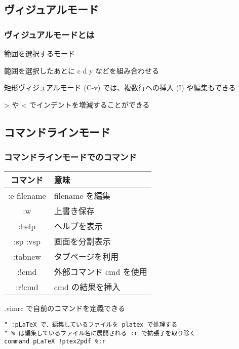 \documentclass[unicode,aspectratio=1610,colorlinks,handout]{beamer}
\begin{document}
\begin{frame}
	\section{ヴィジュアルモード}
\end{frame}

\begin{frame}
	\frametitle{ヴィジュアルモードとは}
	範囲を選択するモード
	
	範囲を選択したあとに c d y などを組み合わせる
	
	矩形ヴィジュアルモード (C-v) では、複数行への挿入 (I) や編集もできる
	
	> や < でインデントを増減することができる
\end{frame}

\begin{frame}
	\section{コマンドラインモード}
\end{frame}

\begin{frame}[fragile]
	\frametitle{コマンドラインモードでのコマンド}
	\begin{center}
		\begin{tabular}{cl}
			コマンド&意味\\
			\hline
			:e filename&filename を編集\\
			:w&上書き保存\\
			:help&ヘルプを表示\\
			:sp :vsp&画面を分割表示\\
			:tabnew&タブページを利用\\
			:!cmd&外部コマンド cmd を使用\\
			:r!cmd&cmd の結果を挿入
		\end{tabular}
	\end{center}
	
	.vimrc で自前のコマンドを定義できる
	
	\begin{lstlisting}
" :pLaTeX で、編集しているファイルを platex で処理する
" % は編集しているファイル名に展開される :r で拡張子を取り除く
command pLaTeX !ptex2pdf %:r
	\end{lstlisting}
\end{frame}
\end{document}
